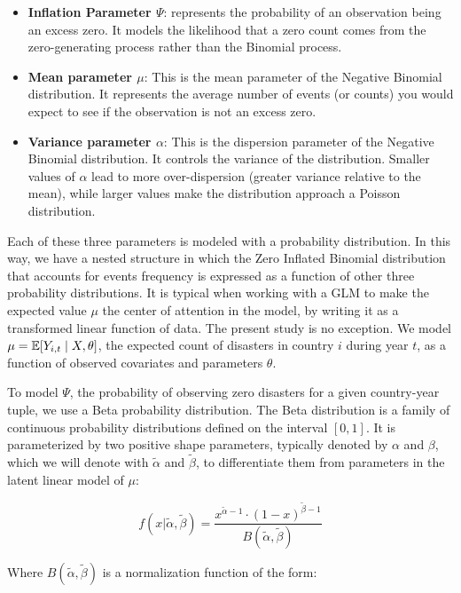 \begin{itemize}
    \item \textbf{Inflation Parameter $\Psi$}: represents the probability of an observation being an excess zero. It models the likelihood that a zero count comes from the zero-generating process rather than the Binomial process.
    \item \textbf{Mean parameter $\mu$}: This is the mean parameter of the Negative Binomial distribution. It represents the average number of events (or counts) you would expect to see if the observation is not an excess zero.
    \item \textbf{Variance parameter $\alpha$}: This is the dispersion parameter of the Negative Binomial distribution. It controls the variance of the distribution. Smaller values of $\alpha$ lead to more over-dispersion (greater variance relative to the mean), while larger values make the distribution approach a Poisson distribution.
\end{itemize}

Each of these three parameters is modeled with a probability distribution. In this way, we have a nested structure in which the Zero Inflated Binomial distribution that accounts for events frequency is expressed as a function of other three probability distributions. It is typical when working with a GLM to make the expected value $\mu$ the center of attention in the model, by writing it as a transformed linear function of data. The present study is no exception. We model $\mu = \mathbb{E}[Y_{i,t} \mid X, \theta]$, the expected count of disasters in country $i$ during year $t$, as a function of observed covariates and parameters $\theta$.

To model $\Psi$, the probability of observing zero disasters for a given country-year tuple, we use a Beta probability distribution. The Beta distribution is a family of continuous probability distributions defined on the interval $[0,1]$. It is parameterized by two positive shape parameters, typically denoted by $\alpha$ and $\beta$, which we will denote with $\tilde{\alpha}$ and $\tilde{\beta}$, to differentiate them from parameters in the latent linear model of $\mu$:

\begin{equation}
f(x|\tilde{\alpha}, \tilde{\beta}) = \frac{x^{\tilde{\alpha}-1} \cdot (1-x)^{\tilde{\beta}-1}}{B(\tilde{\alpha}, \tilde{\beta})}
\end{equation}

Where $B(\tilde{\alpha}, \tilde{\beta})$ is a normalization function of the form:

